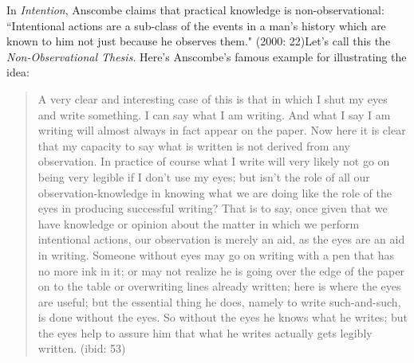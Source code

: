 \documentclass[a4paper,12pt]{article}
\begin{document}
In \emph{Intention}, Anscombe claims that practical knowledge is non-observational: ``Intentional actions are a sub-class of the events in a man's history which are known to him not just because he observes them." (2000: 22)\footnotemark Let's call this the \emph{Non-Observational Thesis}. Here's Anscombe's famous example for illustrating the idea:


\begin{quote}
A very clear and interesting case of this is that in which I shut my eyes and write something. I can say what I am writing. And what I say I am writing will almost always in fact appear on the paper. Now here it is clear that my capacity to say what is written is not derived from any observation. In practice of course what I write will very likely not go on being very legible if I don't use my eyes; but isn't the role of all our observation-knowledge in knowing what we are doing like the role of the eyes in producing successful writing? That is to say, once given that we have knowledge or opinion about the matter in which we perform intentional actions, our observation is merely an aid, as the eyes are an aid in writing. Someone without eyes may go on writing with a pen that has no more ink in it; or may not realize he is going over the edge of the paper on to the table or overwriting lines already written; here is where the eyes are useful; but the essential thing he does, namely to write such-and-such, is done without the eyes. So without the eyes he knows what he writes; but the eyes help to assure him that what he writes actually gets legibly written. (ibid: 53)
\end{quote}
\end{document}
